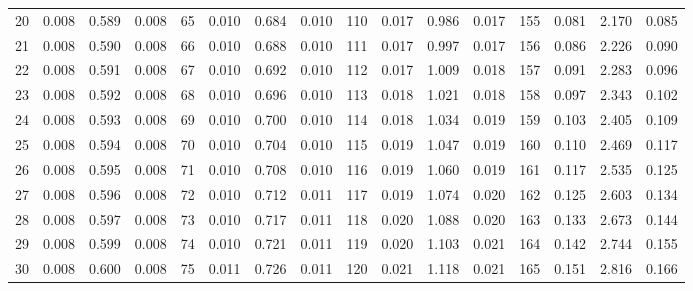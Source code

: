 \begin{table}
{\begin{tabular}{rrrr|rrrr|rrrr|crrr}
 20 & \tiny{  0.008} &   0.589 & \tiny{  0.008} &  65 & \tiny{  0.010} &   0.684 & \tiny{  0.010} & 110 & \tiny{  0.017} &   0.986 & \tiny{  0.017} & 155 & \tiny{  0.081} &   2.170 & \tiny{  0.085}\\
 21 & \tiny{  0.008} &   0.590 & \tiny{  0.008} &  66 & \tiny{  0.010} &   0.688 & \tiny{  0.010} & 111 & \tiny{  0.017} &   0.997 & \tiny{  0.017} & 156 & \tiny{  0.086} &   2.226 & \tiny{  0.090}\\
 22 & \tiny{  0.008} &   0.591 & \tiny{  0.008} &  67 & \tiny{  0.010} &   0.692 & \tiny{  0.010} & 112 & \tiny{  0.017} &   1.009 & \tiny{  0.018} & 157 & \tiny{  0.091} &   2.283 & \tiny{  0.096}\\
 23 & \tiny{  0.008} &   0.592 & \tiny{  0.008} &  68 & \tiny{  0.010} &   0.696 & \tiny{  0.010} & 113 & \tiny{  0.018} &   1.021 & \tiny{  0.018} & 158 & \tiny{  0.097} &   2.343 & \tiny{  0.102}\\
 24 & \tiny{  0.008} &   0.593 & \tiny{  0.008} &  69 & \tiny{  0.010} &   0.700 & \tiny{  0.010} & 114 & \tiny{  0.018} &   1.034 & \tiny{  0.019} & 159 & \tiny{  0.103} &   2.405 & \tiny{  0.109}\\
 25 & \tiny{  0.008} &   0.594 & \tiny{  0.008} &  70 & \tiny{  0.010} &   0.704 & \tiny{  0.010} & 115 & \tiny{  0.019} &   1.047 & \tiny{  0.019} & 160 & \tiny{  0.110} &   2.469 & \tiny{  0.117}\\
 26 & \tiny{  0.008} &   0.595 & \tiny{  0.008} &  71 & \tiny{  0.010} &   0.708 & \tiny{  0.010} & 116 & \tiny{  0.019} &   1.060 & \tiny{  0.019} & 161 & \tiny{  0.117} &   2.535 & \tiny{  0.125}\\
 27 & \tiny{  0.008} &   0.596 & \tiny{  0.008} &  72 & \tiny{  0.010} &   0.712 & \tiny{  0.011} & 117 & \tiny{  0.019} &   1.074 & \tiny{  0.020} & 162 & \tiny{  0.125} &   2.603 & \tiny{  0.134}\\
 28 & \tiny{  0.008} &   0.597 & \tiny{  0.008} &  73 & \tiny{  0.010} &   0.717 & \tiny{  0.011} & 118 & \tiny{  0.020} &   1.088 & \tiny{  0.020} & 163 & \tiny{  0.133} &   2.673 & \tiny{  0.144}\\
 29 & \tiny{  0.008} &   0.599 & \tiny{  0.008} &  74 & \tiny{  0.010} &   0.721 & \tiny{  0.011} & 119 & \tiny{  0.020} &   1.103 & \tiny{  0.021} & 164 & \tiny{  0.142} &   2.744 & \tiny{  0.155}\\
 30 & \tiny{  0.008} &   0.600 & \tiny{  0.008} &  75 & \tiny{  0.011} &   0.726 & \tiny{  0.011} & 120 & \tiny{  0.021} &   1.118 & \tiny{  0.021} & 165 & \tiny{  0.151} &   2.816 & \tiny{  0.166}\\

\end{tabular}}
\end{table}
